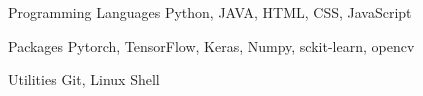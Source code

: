 

\begin{cvskills}

  \cvskill
    {Programming Languages} %
    {Python, JAVA, HTML, CSS, JavaScript} %

  \cvskill
    {Packages} %
    {Pytorch, TensorFlow, Keras, Numpy, sckit-learn, opencv} %
    

  \cvskill
    {Utilities} %
    {Git, Linux Shell} %



\end{cvskills}